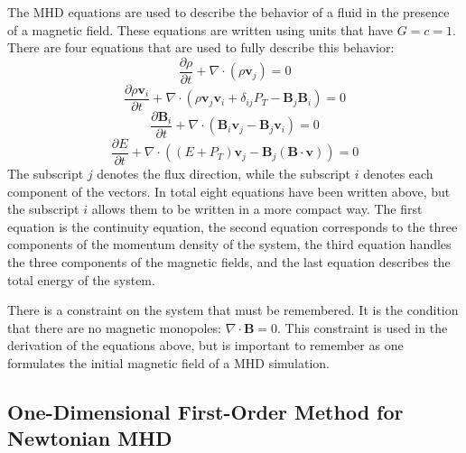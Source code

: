 \documentclass{article}
\begin{document}
The MHD equations are used to describe the behavior of a fluid in the presence of a magnetic field. These equations are written using units that have $G=c=1$. There are four equations that are used to fully describe this behavior:
\begin{equation}
    \frac{\partial \rho}{\partial t} + \nabla \cdot (\rho \boldsymbol{v}_j) = 0
\end{equation} 
\begin{equation}
    \frac{\partial \rho \boldsymbol{v}_i}{\partial t} + \nabla \cdot (\rho \boldsymbol{v}_j \boldsymbol{v}_i + \delta_{ij}P_T - \boldsymbol{B}_j \boldsymbol{B}_i) = 0
\end{equation}
\begin{equation}
    \frac{\partial \boldsymbol{B}_i}{\partial t} + \nabla \cdot (\boldsymbol{B}_i \boldsymbol{v}_j - \boldsymbol{B}_j \boldsymbol{v}_i) = 0
\end{equation}
\begin{equation}
    \frac{\partial E}{\partial t} + \nabla \cdot ((E+P
    _T)\boldsymbol{v}_j - \boldsymbol{B}_j(\boldsymbol{B} \cdot \boldsymbol{v})) = 0
\end{equation}
The subscript $j$ denotes the flux direction, while the subscript $i$ denotes each component of the vectors. In total eight equations have been written above, but the subscript $i$ allows them to be written in a more compact way. The first equation is the continuity equation, the second equation corresponds to the three components of the momentum density of the system, the third equation handles the three components of the magnetic fields, and the last equation describes the total energy of the system.

There is a constraint on the system that must be remembered. It is the condition that there are no magnetic monopoles: $\nabla \cdot \boldsymbol{B} = 0$. This constraint is used in the derivation of the equations above, but is important to remember as one formulates the initial magnetic field of a MHD simulation.
\vspace{6mm}
\begin{center}
    \subsection{One-Dimensional First-Order Method for Newtonian MHD}\label{S3}
\end{center} 
\end{document}
